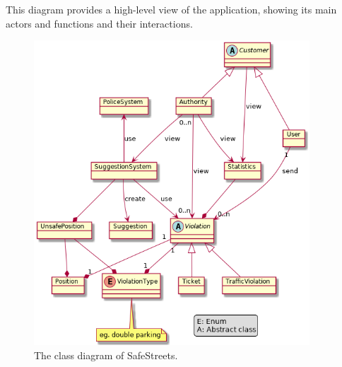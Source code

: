 This diagram provides a high-level view of the application, showing its main actors and functions and their interactions.
\begin{figure}[htp]
	\centering
	\includegraphics[width=0.92\textwidth]{images/Class_Diagram.png}
	\caption{The class diagram of SafeStreets.}
	\label{fig:class-diagram}
\end{figure}
\clearpage
